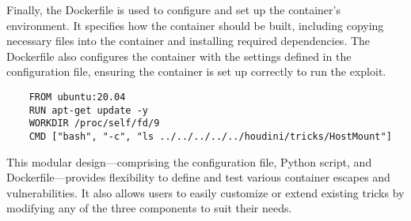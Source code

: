 Finally, the Dockerfile is used to configure and set up the container's environment. It specifies how the container should be built, including copying necessary files into the container and installing required dependencies. The Dockerfile also configures the container with the settings defined in the configuration file, ensuring the container is set up correctly to run the exploit.

\begin{listing}[H]
  \caption{}
\label{lst:dockerfile}
  \begin{verbatim}
    FROM ubuntu:20.04
    RUN apt-get update -y
    WORKDIR /proc/self/fd/9
    CMD ["bash", "-c", "ls ../../../../../houdini/tricks/HostMount"]
  \end{verbatim}
\end{listing}

This modular design—comprising the configuration file, Python script, and Dockerfile—provides flexibility to define and test various container escapes and vulnerabilities. It also allows users to easily customize or extend existing tricks by modifying any of the three components to suit their needs.